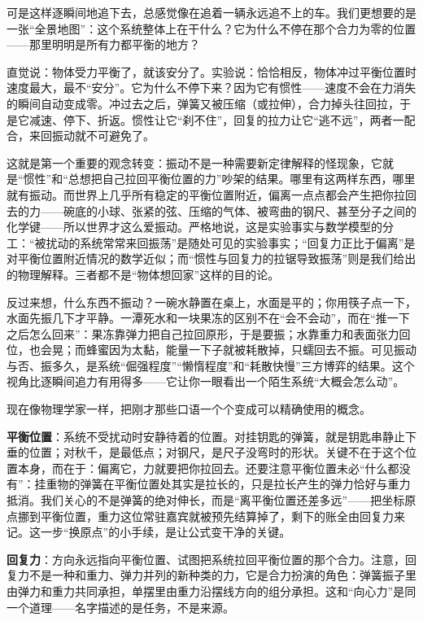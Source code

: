 可是这样逐瞬间地追下去，总感觉像在追着一辆永远追不上的车。我们更想要的是一张“全景地图”：这个系统整体上在干什么？它为什么不停在那个合力为零的位置——那里明明是所有力都平衡的地方？

直觉说：物体受力平衡了，就该安分了。实验说：恰恰相反，物体冲过平衡位置时速度最大，最不“安分”。它为什么不停下来？因为它有惯性——速度不会在力消失的瞬间自动变成零。冲过去之后，弹簧又被压缩（或拉伸），合力掉头往回拉，于是它减速、停下、折返。惯性让它“刹不住”，回复的拉力让它“逃不远”，两者一配合，来回振动就不可避免了。

这就是第一个重要的观念转变：振动不是一种需要新定律解释的怪现象，它就是“惯性”和“总想把自己拉回平衡位置的力”吵架的结果。哪里有这两样东西，哪里就有振动。而世界上几乎所有稳定的平衡位置附近，偏离一点点都会产生把你拉回去的力——碗底的小球、张紧的弦、压缩的气体、被弯曲的钢尺、甚至分子之间的化学键——所以世界才这么爱振动。严格地说，这是实验事实与数学模型的分工：“被扰动的系统常常来回振荡”是随处可见的实验事实；“回复力正比于偏离”是对平衡位置附近情况的数学近似；而“惯性与回复力的拉锯导致振荡”则是我们给出的物理解释。三者都不是“物体想回家”这样的目的论。

反过来想，什么东西不振动？一碗水静置在桌上，水面是平的；你用筷子点一下，水面先振几下才平静。一潭死水和一块果冻的区别不在“会不会动”，而在“推一下之后怎么回来”：果冻靠弹力把自己拉回原形，于是要振；水靠重力和表面张力回位，也会晃；而蜂蜜因为太黏，能量一下子就被耗散掉，只蠕回去不振。可见振动与否、振多久，是系统“倔强程度”“懒惰程度”和“耗散快慢”三方博弈的结果。这个视角比逐瞬间追力有用得多——它让你一眼看出一个陌生系统“大概会怎么动”。


现在像物理学家一样，把刚才那些口语一个个变成可以精确使用的概念。

\textbf{平衡位置}：系统不受扰动时安静待着的位置。对挂钥匙的弹簧，就是钥匙串静止下垂的位置；对秋千，是最低点；对钢尺，是尺子没弯时的形状。关键不在于这个位置本身，而在于：偏离它，力就要把你拉回去。还要注意平衡位置未必“什么都没有”：挂重物的弹簧在平衡位置处其实是拉长的，只是拉长产生的弹力恰好与重力抵消。我们关心的不是弹簧的绝对伸长，而是“离平衡位置还差多远”——把坐标原点挪到平衡位置，重力这位常驻嘉宾就被预先结算掉了，剩下的账全由回复力来记。这一步“换原点”的小手续，是让公式变干净的关键。

\textbf{回复力}：方向永远指向平衡位置、试图把系统拉回平衡位置的那个合力。注意，回复力不是一种和重力、弹力并列的新种类的力，它是合力扮演的角色：弹簧振子里由弹力和重力共同承担，单摆里由重力沿摆线方向的组分承担。这和“向心力”是同一个道理——名字描述的是任务，不是来源。

